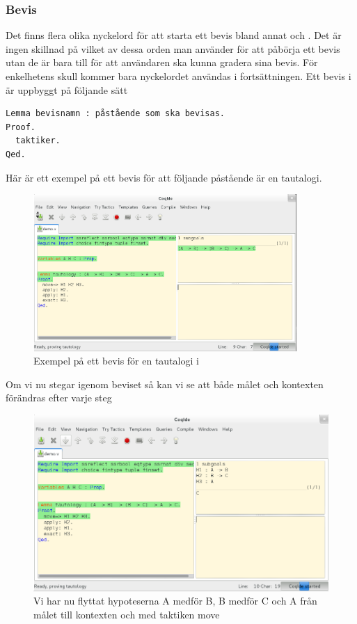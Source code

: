 \subsubsection{Bevis}
Det finns flera olika nyckelord för att starta ett bevis bland annat
 och . Det är ingen skillnad på vilket
av dessa orden man använder för att påbörja ett bevis utan de är bara
till för att användaren ska kunna gradera sina bevis. För enkelhetens skull
kommer bara nyckelordet  användas i fortsättningen. Ett bevis i
\coq är uppbyggt på följande sätt

\begin{lstlisting}
Lemma bevisnamn : påstående som ska bevisas.
Proof.
  taktiker.
Qed.
\end{lstlisting}

Här är ett exempel på ett bevis för att följande påstående är en tautalogi.

\begin{figure}[H]
  \centering
  \includegraphics[width=100mm]{images/Proof_part1}
  \caption[Exempel på bevis i \coq]
   {Exempel på ett bevis för en tautalogi i \coq}
\end{figure}

Om vi nu stegar igenom beviset så kan vi se att både målet och kontexten
förändras efter varje steg

\begin{figure}[H]
  \centering
  \includegraphics[width=150mm]{images/Proof_part2}
  \caption[Bevis i \coq IDE]
   {Vi har nu flyttat hypoteserna A medför B, B medför C och A
    från målet till kontexten och med taktiken move}
\end{figure}

